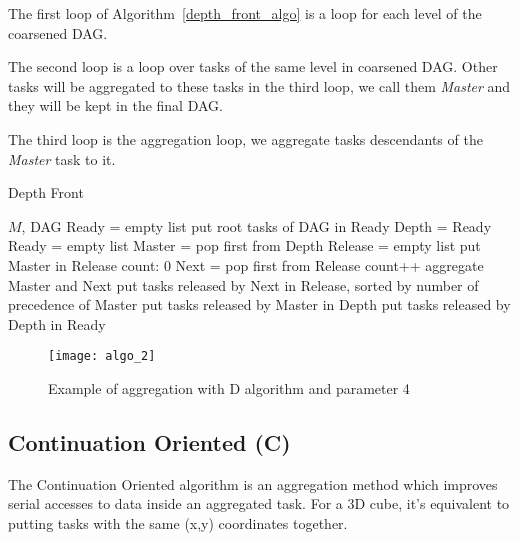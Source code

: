 The first loop of Algorithm~\ref{depth_front_algo} is a loop for each
level of the coarsened DAG.

The second loop is a loop over tasks of the same level in coarsened DAG.
Other tasks will be aggregated to these tasks in the third loop, we call them
{\em Master} and they will be kept in the final DAG.

The third loop is the aggregation loop, we aggregate tasks descendants of
the {\em Master} task to it.

\begin{algorithm}
  \caption{Depth Front}
  \label{depth_front_algo}
  \begin{algorithmic}
    \REQUIRE $M$, DAG
    \STATE Ready = empty list
    \STATE put root tasks of DAG in Ready
    \STATE Depth = Ready
    \STATE Ready = empty list
    \STATE Master = pop first from Depth
    \STATE Release = empty list
    \STATE put Master in Release
    \STATE count: 0
    \STATE Next = pop first from Release
    \STATE count++
    \STATE aggregate Master and Next
    \STATE put tasks released by Next in Release, sorted by
    \STATE \quad number of precedence of Master
    \ENDWHILE
    \STATE put tasks released by Master in Depth
    \ENDWHILE
    \STATE put tasks released by Depth in Ready
    \ENDWHILE
  \end{algorithmic}
\end{algorithm}

\begin{figure}[!ht]
  \centering
  \texttt{[image: algo\_2]}
  \caption{Example of aggregation with D algorithm and parameter 4}
  \label{fig:D_algo}
\end{figure}

\subsection{Continuation Oriented (C)}
The Continuation Oriented algorithm is an aggregation method which improves
serial accesses to data inside an aggregated task. For a 3D cube,
it's equivalent to putting tasks with the same (x,y) coordinates together.





